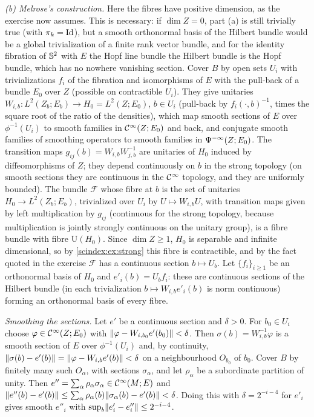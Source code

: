 \emph{(b) Melrose's construction.} Here the fibres have positive dimension, as
the exercise now assumes. This is necessary: if $\dim Z=0$, part (a) is still
trivially true (with $\pi_k=\operatorname{Id}$), but a smooth orthonormal basis of the Hilbert
bundle would be a global trivialization of a finite rank vector bundle, and for
the identity fibration of $\mathbb{S}^2$ with $E$ the Hopf line bundle the Hilbert
bundle is the Hopf bundle, which has no nowhere vanishing section. Cover $B$ by open sets $U_i$ with trivializations
$f_i$ of the fibration and isomorphisms of $E$ with the pull-back of a bundle $E_0$
over $Z$ (possible on contractible $U_i$). They give unitaries
$W_{i,b}:L^2(Z_b;E_b)\to H_0=L^2(Z;E_0)$, $b\in U_i$ (pull-back by
$f_i(\cdot,b)^{-1}$, times the square root of the ratio of the densities), which map
smooth sections of $E$ over $\phi^{-1}(U_i)$ to smooth families in $\mathcal{C}^\infty(Z;E_0)$
and back, and conjugate smooth families of smoothing operators to smooth families
in $\Psi^{-\infty}(Z;E_0)$. The transition maps $g_{ij}(b)=W_{i,b}W_{j,b}^{-1}$
are unitaries of $H_0$ induced by diffeomorphisms of $Z$; they depend continuously
on $b$ in the strong topology (on smooth sections they are continuous in the
$\mathcal{C}^\infty$ topology, and they are uniformly bounded). The bundle $\mathcal F$ whose fibre
at $b$ is the set of unitaries $H_0\to L^2(Z_b;E_b)$, trivialized over $U_i$ by
$U\mapsto W_{i,b}U$, with transition maps given by left multiplication by
$g_{ij}$ (continuous for the strong topology, because multiplication is jointly
strongly continuous on the unitary group), is a fibre bundle with fibre
$\mathrm U(H_0)$. Since $\dim Z\ge1$, $H_0$ is separable and infinite dimensional,
so by \cref{scindex:ex:strong} this fibre is contractible, and by the fact quoted
in the exercise $\mathcal F$ has a continuous section $b\mapsto U_b$. Let
$\{f_i\}_{i\ge1}$ be an orthonormal basis of $H_0$ and $e'_i(b)=U_bf_i$: these are
continuous sections of the Hilbert bundle (in each trivialization
$b\mapsto W_{i,b}e'_i(b)$ is norm continuous) forming an orthonormal basis of every
fibre.

\emph{Smoothing the sections.} Let $e'$ be a continuous section and $\delta>0$. For
$b_0\in U_i$ choose $\varphi\in\mathcal{C}^\infty(Z;E_0)$ with
$\lVert \varphi-W_{i,b_0}e'(b_0)\rVert<\delta$. Then $\sigma(b)=W_{i,b}^{-1}\varphi$ is a
smooth section of $E$ over $\phi^{-1}(U_i)$ and, by continuity,
$\lVert \sigma(b)-e'(b)\rVert=\lVert \varphi-W_{i,b}e'(b)\rVert<\delta$ on a neighbourhood
$O_{b_0}$ of $b_0$. Cover $B$ by finitely many such $O_\alpha$, with sections
$\sigma_\alpha$, and let $\rho_\alpha$ be a subordinate partition of unity. Then
$e''=\sum_\alpha\rho_\alpha\sigma_\alpha\in\mathcal{C}^\infty(M;E)$ and
$\lVert e''(b)-e'(b)\rVert\le\sum_\alpha\rho_\alpha(b)\lVert \sigma_\alpha(b)-e'(b)\rVert<\delta$.
Doing this with $\delta=2^{-i-4}$ for $e'_i$ gives smooth $e''_i$ with
$\sup_b\lVert e'_i-e''_i\rVert\le2^{-i-4}$.


